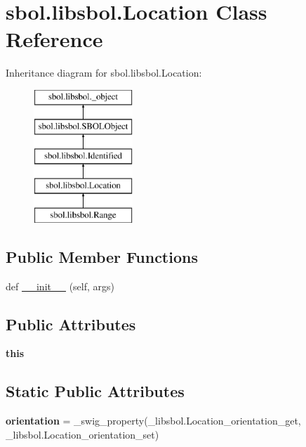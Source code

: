 \hypertarget{classsbol_1_1libsbol_1_1_location}{}\section{sbol.\+libsbol.\+Location Class Reference}
\label{classsbol_1_1libsbol_1_1_location}
Inheritance diagram for sbol.\+libsbol.\+Location\+:\begin{figure}[H]
\begin{center}
\leavevmode
\includegraphics[height=5.000000cm]{classsbol_1_1libsbol_1_1_location}
\end{center}
\end{figure}
\subsection*{Public Member Functions}
\begin{DoxyCompactItemize}
\item 
def \hyperlink{classsbol_1_1libsbol_1_1_location_ad7951e052a7ad74601e2b1ecf72085b0}{\+\_\+\+\_\+init\+\_\+\+\_\+} (self, args)
\end{DoxyCompactItemize}
\subsection*{Public Attributes}
\begin{DoxyCompactItemize}
\item 
{\bfseries this}\hypertarget{classsbol_1_1libsbol_1_1_location_acc6f8f53e3d4a40163b4b08b7259d9d7}{}\label{classsbol_1_1libsbol_1_1_location_acc6f8f53e3d4a40163b4b08b7259d9d7}

\end{DoxyCompactItemize}
\subsection*{Static Public Attributes}
\begin{DoxyCompactItemize}
\item 
{\bfseries orientation} = \+\_\+swig\+\_\+property(\+\_\+libsbol.\+Location\+\_\+orientation\+\_\+get, \+\_\+libsbol.\+Location\+\_\+orientation\+\_\+set)\hypertarget{classsbol_1_1libsbol_1_1_location_a69b3ce1b30ffeb03a18b2a1e07c0e7c6}{}\label{classsbol_1_1libsbol_1_1_location_a69b3ce1b30ffeb03a18b2a1e07c0e7c6}

\end{DoxyCompactItemize}



